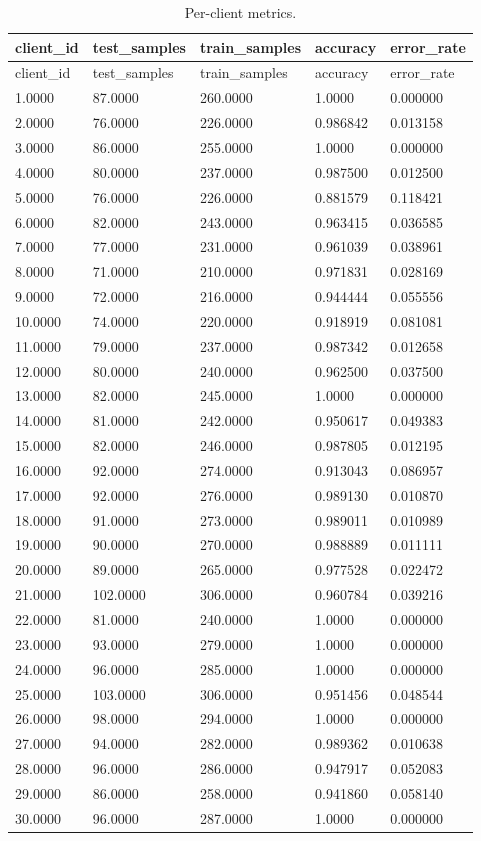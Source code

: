 \documentclass[11pt]{report}
\begin{document}
\begin{longtable}{lllll}
\caption{Per-client metrics.}\\
\toprule
client\_id & test\_samples & train\_samples & accuracy & error\_rate \\
\midrule
\endfirsthead
\toprule
client\_id & test\_samples & train\_samples & accuracy & error\_rate \\
\midrule
\endhead
1.0000 & 87.0000 & 260.0000 & 1.0000 & 0.000000 \\
2.0000 & 76.0000 & 226.0000 & 0.986842 & 0.013158 \\
3.0000 & 86.0000 & 255.0000 & 1.0000 & 0.000000 \\
4.0000 & 80.0000 & 237.0000 & 0.987500 & 0.012500 \\
5.0000 & 76.0000 & 226.0000 & 0.881579 & 0.118421 \\
6.0000 & 82.0000 & 243.0000 & 0.963415 & 0.036585 \\
7.0000 & 77.0000 & 231.0000 & 0.961039 & 0.038961 \\
8.0000 & 71.0000 & 210.0000 & 0.971831 & 0.028169 \\
9.0000 & 72.0000 & 216.0000 & 0.944444 & 0.055556 \\
10.0000 & 74.0000 & 220.0000 & 0.918919 & 0.081081 \\
11.0000 & 79.0000 & 237.0000 & 0.987342 & 0.012658 \\
12.0000 & 80.0000 & 240.0000 & 0.962500 & 0.037500 \\
13.0000 & 82.0000 & 245.0000 & 1.0000 & 0.000000 \\
14.0000 & 81.0000 & 242.0000 & 0.950617 & 0.049383 \\
15.0000 & 82.0000 & 246.0000 & 0.987805 & 0.012195 \\
16.0000 & 92.0000 & 274.0000 & 0.913043 & 0.086957 \\
17.0000 & 92.0000 & 276.0000 & 0.989130 & 0.010870 \\
18.0000 & 91.0000 & 273.0000 & 0.989011 & 0.010989 \\
19.0000 & 90.0000 & 270.0000 & 0.988889 & 0.011111 \\
20.0000 & 89.0000 & 265.0000 & 0.977528 & 0.022472 \\
21.0000 & 102.0000 & 306.0000 & 0.960784 & 0.039216 \\
22.0000 & 81.0000 & 240.0000 & 1.0000 & 0.000000 \\
23.0000 & 93.0000 & 279.0000 & 1.0000 & 0.000000 \\
24.0000 & 96.0000 & 285.0000 & 1.0000 & 0.000000 \\
25.0000 & 103.0000 & 306.0000 & 0.951456 & 0.048544 \\
26.0000 & 98.0000 & 294.0000 & 1.0000 & 0.000000 \\
27.0000 & 94.0000 & 282.0000 & 0.989362 & 0.010638 \\
28.0000 & 96.0000 & 286.0000 & 0.947917 & 0.052083 \\
29.0000 & 86.0000 & 258.0000 & 0.941860 & 0.058140 \\
30.0000 & 96.0000 & 287.0000 & 1.0000 & 0.000000 \\
\bottomrule
\end{longtable}
\end{document}
